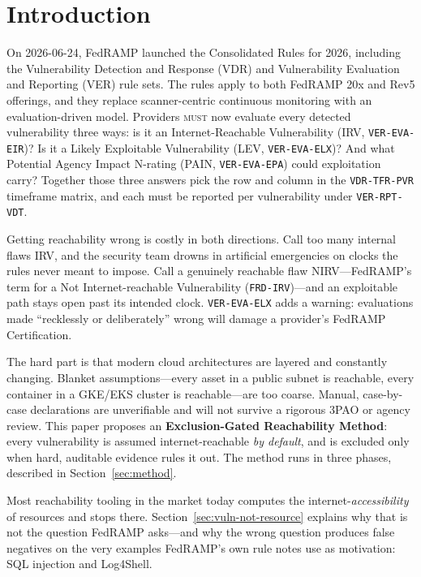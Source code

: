\documentclass[11pt]{article}
\newcommand{\code}[1]{\texttt{#1}}
\newcommand{\rfckw}[1]{\textsc{#1}}
\begin{document}
\section{Introduction}
On 2026-06-24, FedRAMP launched the Consolidated Rules for 2026, including the Vulnerability Detection and Response (VDR) and Vulnerability Evaluation and Reporting (VER) rule sets. The rules apply to both FedRAMP 20x and Rev5 offerings, and they replace scanner-centric continuous monitoring with an evaluation-driven model. Providers \rfckw{must} now evaluate every detected vulnerability three ways: is it an Internet-Reachable Vulnerability (IRV, \code{VER-EVA-EIR})? Is it a Likely Exploitable Vulnerability (LEV, \code{VER-EVA-ELX})? And what Potential Agency Impact N-rating (PAIN, \code{VER-EVA-EPA}) could exploitation carry? Together those three answers pick the row and column in the \code{VDR-TFR-PVR} timeframe matrix, and each must be reported per vulnerability under \code{VER-RPT-VDT}.

Getting reachability wrong is costly in both directions. Call too many internal flaws IRV, and the security team drowns in artificial emergencies on clocks the rules never meant to impose. Call a genuinely reachable flaw NIRV---FedRAMP's term for a Not Internet-reachable Vulnerability (\code{FRD-IRV})---and an exploitable path stays open past its intended clock. \code{VER-EVA-ELX} adds a warning: evaluations made ``recklessly or deliberately'' wrong will damage a provider's FedRAMP Certification.

The hard part is that modern cloud architectures are layered and constantly changing. Blanket assumptions---every asset in a public subnet is reachable, every container in a GKE/EKS cluster is reachable---are too coarse. Manual, case-by-case declarations are unverifiable and will not survive a rigorous 3PAO or agency review. This paper proposes an \textbf{Exclusion-Gated Reachability Method}: every vulnerability is assumed internet-reachable \emph{by default}, and is excluded only when hard, auditable evidence rules it out. The method runs in three phases, described in Section~\ref{sec:method}.

Most reachability tooling in the market today computes the internet-\emph{accessibility} of resources and stops there. Section~\ref{sec:vuln-not-resource} explains why that is not the question FedRAMP asks---and why the wrong question produces false negatives on the very examples FedRAMP's own rule notes use as motivation: SQL injection and Log4Shell.
\end{document}
